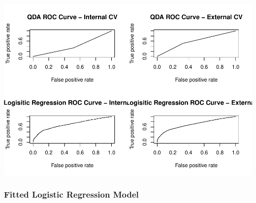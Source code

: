 \documentclass[american,]{article}
\begin{document}
\includegraphics{Final_Project_Applied_JN2_files/figure-latex/ROC curves-1.pdf}

\hypertarget{fitted-logistic-regression-model}{%
\subsubsection{Fitted Logistic Regression Model}\label{fitted-logistic-regression-model}}
\end{document}
